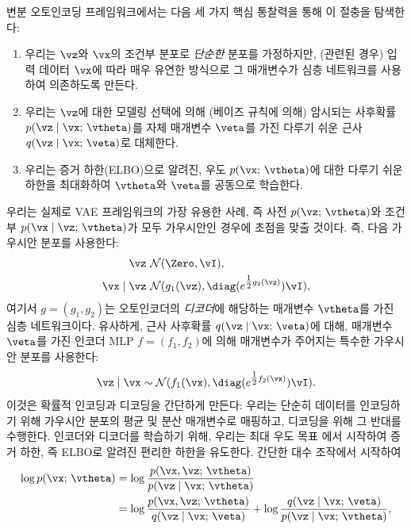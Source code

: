 \documentclass[../../book-main_ko.tex]{subfiles}
\begin{document}
변분 오토인코딩 프레임워크에서는 다음 세 가지 핵심 통찰력을 통해 이 절충을 탐색한다:
\begin{enumerate}
	
\item 우리는 $\vz$와 $\vx$의 조건부 분포로 \textit{단순한} 분포를 가정하지만, (관련된 경우) 입력 데이터 $\vx$에 따라 매우 유연한 방식으로 그 매개변수가 심층 네트워크를 사용하여 의존하도록 만든다.
	
\item 우리는 $\vz$에 대한 모델링 선택에 의해 (베이즈 규칙에 의해) 암시되는 사후확률 $p(\vz \mid \vx;\, \vtheta)$를 자체 매개변수 $\veta$를 가진 다루기 쉬운 근사 $q(\vz \mid \vx;\, \veta)$로 대체한다.
	
\item 우리는 증거 하한(ELBO)으로 알려진, 우도 $p(\vx ;\, \vtheta)$에 대한 다루기 쉬운 하한을 최대화하여 $\vtheta$와 $\veta$를 공동으로 학습한다.
\end{enumerate}
우리는 실제로 VAE 프레임워크의 가장 유용한 사례, 즉 사전 $p(\vz ;\, \vtheta)$와 조건부 $p(\vx \mid \vz;\, \vtheta)$가 모두 가우시안인 경우에 초점을 맞출 것이다. 즉, 다음 가우시안 분포를 사용한다:
\begin{align*}
\vz &~ \mathcal{N}(\Zero, \vI), \\
\vx \mid \vz &~ \mathcal{N}(g_1(\vz), \diag(e^{\tfrac{1}{2}g_2(\vz)}) \vI),
\end{align*}
여기서 $g = (g_1, g_2)$는 오토인코더의 \textit{디코더}에 해당하는 매개변수 $\vtheta$를 가진 심층 네트워크이다.
유사하게, 근사 사후확률 $q(\vz \mid \vx;\, \veta)$에 대해, 매개변수 $\veta$를 가진 인코더 MLP $f = (f_1, f_2)$에 의해 매개변수가 주어지는 특수한 가우시안 분포를 사용한다:
\begin{equation*}
\vz \mid \vx \sim \mathcal{N}(f_1(\vx), \diag(e^{\tfrac{1}{2}f_2(\vx)}) \vI).
\end{equation*}
이것은 확률적 인코딩과 디코딩을 간단하게 만든다: 우리는 단순히 데이터를 인코딩하기 위해 가우시안 분포의 평균 및 분산 매개변수로 매핑하고, 디코딩을 위해 그 반대를 수행한다.
인코더와 디코더를 학습하기 위해, 우리는 최대 우도 목표 에서 시작하여 증거 하한, 즉 ELBO로 알려진 편리한 하한을 유도한다. 간단한 대수 조작에서 시작하여
\begin{align*}
\log p(\vx;\, \vtheta) &= \log \frac{p(\vx, \vz;\, \vtheta)}{p(\vz \mid \vx;\, \vtheta)} \\
&= \log \frac{p(\vx, \vz;\, \vtheta)}{q(\vz \mid \vx;\, \veta)}
 + \log \frac{q(\vz \mid \vx;\, \veta)}{p(\vz \mid \vx;\, \vtheta)},
\end{align*}
\end{document}
